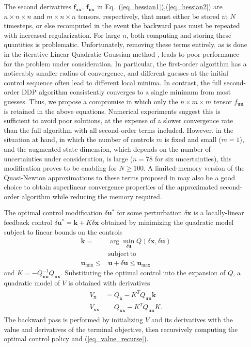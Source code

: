 \documentclass[journal ]{new-aiaa}
\newcommand{\state}{\ensuremath{\mathbf{x}}}
\newcommand{\control}{\ensuremath{\mathbf{u}}}
\begin{document}
The second derivatives $\mathbf{f}_{\state\state},\, \mathbf{f}_{\control\state}$ in Eq.~(\ref{eq_hessian1}),(\ref{eq_hessian2}) are $n\times n\times n$ and $m\times n\times n$ tensors, respectively, that must either be stored at $N$ timesteps, or else recomputed in the event the backward pass must be repeated with increased regularization. For large $n$, both computing and storing these quantities is problematic. Unfortunately, removing these terms entirely, as is done in the iterative Linear Quadratic Gaussian method \cite{iLQG}, leads to poor performance for the problem under consideration. In particular, the first-order algorithm has a noticeably smaller radius of convergence, and different guesses at the initial control sequence often lead to different local minima. In contrast, the full second-order DDP algorithm consistently converges to a single minimum from most guesses. Thus, we propose a compromise in which only the $n\times m \times m$ tensor $f_{\control\control}$ is retained in the above equations. Numerical experiments suggest this is sufficient to avoid poor solutions, at the expense of a slower convergence rate than the full algorithm with all second-order terms included. However, in the situation at hand, in which the number of controls $m$ is fixed and small ($ m=1 $), and the augmented state dimension, which depends on the number of uncertainties under consideration, is large ($n=78$ for six uncertainties), this modification proves to be enabling for $N\geq 100$. A limited-memory version of the Quasi-Newton approximations to these terms proposed in \cite{QNDDP} may also be a good choice to obtain superlinear convergence properties of the approximated second-order algorithm while reducing the memory required. 

The optimal control modification $\delta\control^*$ for some perturbation $\delta\state$ is a locally-linear feedback control $\delta\control^* = \mathbf{k} + K\delta\state$ obtained by minimizing the quadratic model subject to linear bounds on the controls
\begin{align}
\mathbf{k} = &\arg\min_{\delta\control} Q(\delta\state,\delta\control) \\
&\mathrm{subject\,to\,\;} \nonumber\\
\control_{\min}\le &\control+\delta\control \le\control_{\max}
\end{align}
and $K = -Q_{\control\control}^{-1}Q_{\control\state}$. Substituting the optimal control into the expansion of $Q$, a quadratic model of $V$ is obtained with derivatives
\begin{align}
\begin{split}
\label{eq_value_recurse}
V_\state &= Q_{\state}- K^TQ_{\control\control}\mathbf{k}\\
V_{\state\state} &= Q_{\state\state} - K^TQ_{\control\control}K.
\end{split}
\end{align}
The backward pass is performed by initializing $V$ and its derivatives with the value and derivatives of the terminal objective, then recursively computing the optimal control policy and (\ref{eq_value_recurse}).
\end{document}
